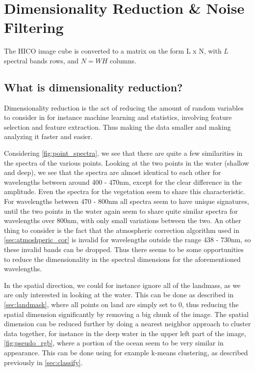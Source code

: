 \section{Dimensionality Reduction \& Noise Filtering}

The HICO image cube is converted to a matrix on the form L x N, 
with $L$ spectral bands rows, and $N = WH$ columns. 

\subsection{What is dimensionality reduction?}

Dimensionality reduction is the act of reducing the amount of random variables 
to consider in for instance machine learning and statistics, involving feature 
selection and feature extraction. Thus making the data smaller and making 
analyzing it faster and easier. 

Considering \cref{fig:point_spectra}, we see that there are quite a few similarities 
in the spectra of the various points. Looking at the two points in the water (shallow 
and deep), we see that the spectra are almost identical to each other for wavelengths 
between around 400 - 470nm, except for the clear difference in the amplitude. Even the 
spectra for the vegetation seem to share this characteristic. For wavelengths between 
470 - 800nm all spectra seem to have unique signatures, until the two points in the 
water again seem to share quite similar spectra for wavelengths over 800nm, with only 
small variations between the two. An other thing to consider is the fact that the 
atmospheric correction algorithm used in \cref{sec:atmoshperic_cor} is invalid for 
wavelengths outside the range 438 - 730nm, so these invalid bands can be dropped. 
Thus there seems to be some opportunities to reduce the dimensionality in the 
spectral dimensions for the aforementioned wavelengths.

In the spatial direction, we could for instance ignore all of the landmass, as we 
are only interested in looking at the water. This can be done as described in 
\cref{sec:landmask}, where all points on land are simply set to 0, thus reducing the 
spatial dimension significantly by removing a big chunk of the image. The spatial 
dimension can be reduced further by doing a nearest neighbor approach to cluster data 
together, for instance in the deep water in the upper left part of the image, \cref{fig:pseudo_rgb}, 
where a portion of the ocean seem to be very similar in appearance. This can be done 
using for example k-means clustering, as described previously in \cref{sec:classify}. 

